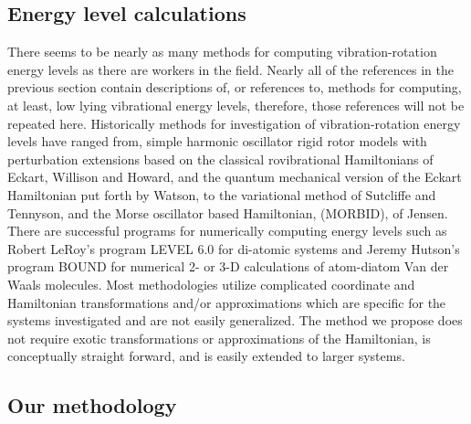 \documentclass[12pt,thmsa]{article}
\begin{document}
\subsection{Energy level calculations}

There seems to be nearly as many methods for computing vibration-rotation
energy levels as there are workers in the field. Nearly all of the
references in the previous section contain descriptions of, or references
to, methods for computing, at least, low lying vibrational energy levels,
therefore, those references will not be repeated here. Historically methods
for investigation of vibration-rotation energy levels have ranged from,
simple harmonic oscillator rigid rotor models with perturbation extensions
based on the classical rovibrational Hamiltonians of Eckart\cite{Eckart35},
Willison and Howard\cite{WilsonHoward36}, and the quantum mechanical version
of the Eckart Hamiltonian put forth by Watson\cite{Watson68}, to the
variational method of Sutcliffe and Tennyson\cite{SutcliffeTennyson87}, and
the Morse oscillator based Hamiltonian, (MORBID), of Jensen\cite{Jensen88}.
There are successful programs for numerically computing energy levels such
as Robert LeRoy's program LEVEL 6.0\cite{LeRoy95} for di-atomic systems and
Jeremy Hutson's program BOUND\cite{Hutson93} for numerical 2- or 3-D
calculations of atom-diatom Van der Waals molecules. Most methodologies
utilize complicated coordinate and Hamiltonian transformations and/or
approximations which are specific for the systems investigated and are not
easily generalized. The method we propose does not require exotic
transformations or approximations of the Hamiltonian, is conceptually
straight forward, and is easily extended to larger systems.

\subsection{Our methodology}
\end{document}
